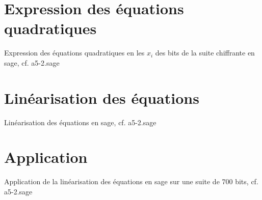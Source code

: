 \documentclass[a4paper]{article}
\begin{document}


\section{Expression des équations quadratiques}
Expression des équations quadratiques en les $x_i$ des bits de la suite chiffrante en sage, cf. a5-2.sage



\section{Linéarisation des équations}
Linéarisation des équations en sage, cf. a5-2.sage

\section{Application}
Application de la linéarisation des équations en sage sur une suite de 700 bits, cf. a5-2.sage






\nocite{*}
\end{document}
